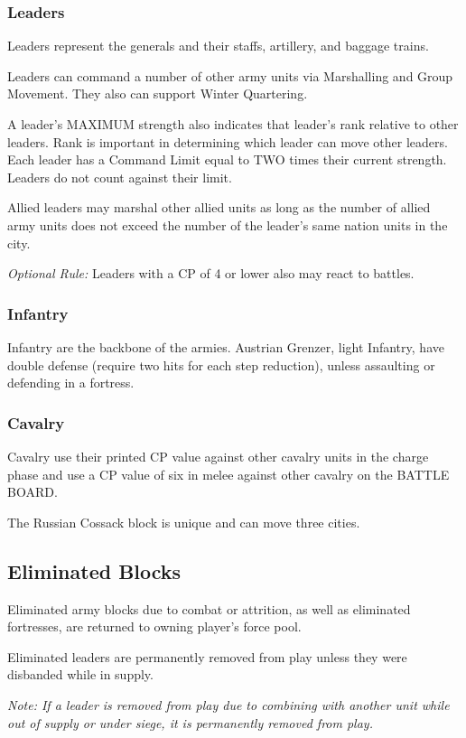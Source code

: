 \subsubsection{Leaders}

Leaders represent the generals and their staffs, artillery, and baggage trains.

Leaders can command a number of other army units via Marshalling and Group Movement. They also can support Winter Quartering.

A leader’s MAXIMUM strength also indicates that leader’s rank relative to other leaders. Rank is important in determining which leader can move other leaders. Each leader has a Command Limit equal to TWO times their current strength. Leaders do not count against their limit.

Allied leaders may marshal other allied units as long as the number of allied army units does not exceed the number of the leader’s same nation units in the city.

\textit{Optional Rule:} Leaders with a CP of 4 or lower also may react to battles.

\subsubsection{Infantry}

Infantry are the backbone of the armies. Austrian Grenzer, light Infantry, have double defense (require two hits for each step reduction), unless assaulting or defending in a fortress.

\subsubsection{Cavalry}

Cavalry use their printed CP value against other cavalry units in the charge phase and use a CP value of six in melee against other cavalry on the BATTLE BOARD.

The Russian Cossack block is unique and can move three cities.

\subsection{Eliminated Blocks}

Eliminated army blocks due to combat or attrition, as well as eliminated fortresses, are returned to owning player’s force pool.

Eliminated leaders are permanently removed from play unless they were disbanded while in supply.

\textit{Note: If a leader is removed from play due to combining with another unit while out of supply or under siege, it is permanently removed from play.}